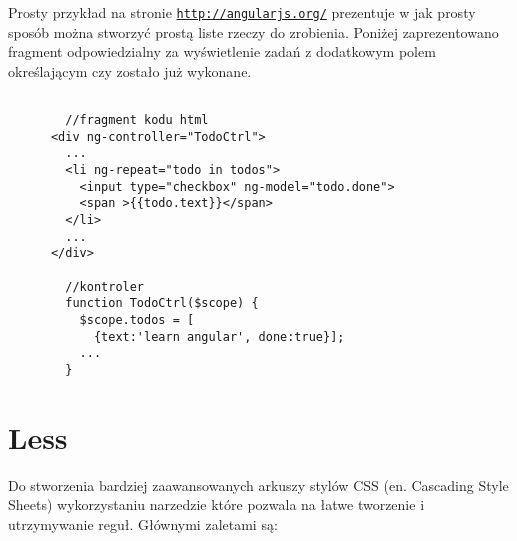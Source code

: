 Prosty przykład na stronie \underline{\texttt{http://angularjs.org/}} prezentuje w jak prosty sposób można stworzyć prostą liste rzeczy do zrobienia. Poniżej zaprezentowano fragment odpowiedzialny za wyświetlenie zadań z dodatkowym polem określającym czy zostało już wykonane.

\lstset{language=JavaScript}
\begin{lstlisting}[caption=AngularJs]

        //fragment kodu html
      <div ng-controller="TodoCtrl">
        ...
        <li ng-repeat="todo in todos">
          <input type="checkbox" ng-model="todo.done">
          <span >{{todo.text}}</span>
        </li>
        ...
      </div>

        //kontroler
        function TodoCtrl($scope) {
          $scope.todos = [
            {text:'learn angular', done:true}];
          ...
        }
\end{lstlisting}

\section{Less}
\label{sec:less}

Do stworzenia bardziej zaawansowanych arkuszy stylów CSS (en. Cascading Style Sheets) wykorzystaniu narzedzie które pozwala na łatwe tworzenie i utrzymywanie reguł. Głównymi zaletami są:

